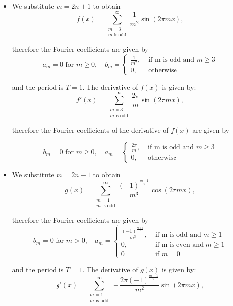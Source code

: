 \documentclass[11pt]{article}
\begin{document}
\begin{solution}     
    \begin{itemize}
    \item We substitute $m = 2n+1$ to obtain 
    \[
            f(x) = \sum_{\substack{m=3\\m \text{ is odd}}}^{\infty} \frac{1}{m^2}\sin(2\pi m x),
    \]

    therefore the Fourier coefficients are given by 
    \[
    a_m = 0 \text{ for } m \geq 0, \quad b_m = \begin{cases}\frac{1}{m^2}, & \text { if m is odd and }m \geq 3 \\ 0, & \text{ otherwise }  \end{cases} 
    \]

    and the period is $T = 1$. The derivative of $f(x)$ is given by:
    \[
    f'(x) = \sum_{\substack{m=3\\m \text{ is odd}}}^{\infty} \frac{2\pi}{m}\sin(2\pi m x),
    \]

    therefore the Fourier coefficients of the derivative of $f(x)$ are given by 

    \[
    b_m = 0 \text{ for } m \geq 0, \quad a_m = \begin{cases}\frac{2\pi}{m}, & \text { if m is odd and }m \geq 3 \\ 0, & \text{ otherwise }  \end{cases} 
    \]

    \item We substitute $m = 2n-1$ to obtain 
    \[
        g(x) = \sum_{\substack{ m=1 \\ m \text{ is odd}}}^{\infty} \frac{(-1)^{\frac{m+1}{2}}}{m^3}\cos(2\pi m x),
    \]

    therefore the Fourier coefficients are given by 
    \[
    b_m = 0 \text{ for } m >0, \quad a_m = \begin{cases}\frac{(-1)^{\frac{m+1}{2}}}{m^3}, & \text { if m is odd and }m \geq 1 \\ 0, & \text{ if m is even and } m \geq 1\\ 0 & \text{ if } m = 0  \end{cases} 
    \]

    and the period is $T = 1$. The derivative of $g(x)$ is given by:
    \[
    g'(x) = \sum_{\substack{m=1\\m \text{ is odd}}}^{\infty} -\frac{2\pi (-1)^{\frac{m+1}{2}}}{m^2}\sin(2\pi m x),
    \]


\end{itemize}
\end{solution}
\end{document}
